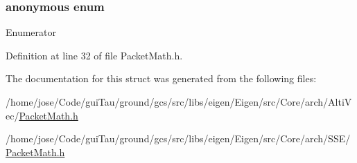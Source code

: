 \hypertarget{structei__packet__traits_3_01float_01_4_a1ddb0f3d8f49102d406f6448e72156b3}{\subsubsection[{anonymous enum}]{\setlength{\rightskip}{0pt plus 5cm}anonymous enum}}\label{structei__packet__traits_3_01float_01_4_a1ddb0f3d8f49102d406f6448e72156b3}
\begin{Desc}
\item[Enumerator]\par
\begin{description}
\item[{\em 
\hypertarget{structei__packet__traits_3_01float_01_4_a1ddb0f3d8f49102d406f6448e72156b3ac1adc8ee30145fa8d745c6c2d6b3bbba}{size}\label{structei__packet__traits_3_01float_01_4_a1ddb0f3d8f49102d406f6448e72156b3ac1adc8ee30145fa8d745c6c2d6b3bbba}
}]\end{description}
\end{Desc}


Definition at line 32 of file Packet\-Math.\-h.



The documentation for this struct was generated from the following files\-:\begin{DoxyCompactItemize}
\item 
/home/jose/\-Code/gui\-Tau/ground/gcs/src/libs/eigen/\-Eigen/src/\-Core/arch/\-Alti\-Vec/\hyperlink{_alti_vec_2_packet_math_8h}{Packet\-Math.\-h}\item 
/home/jose/\-Code/gui\-Tau/ground/gcs/src/libs/eigen/\-Eigen/src/\-Core/arch/\-S\-S\-E/\hyperlink{_s_s_e_2_packet_math_8h}{Packet\-Math.\-h}\end{DoxyCompactItemize}
